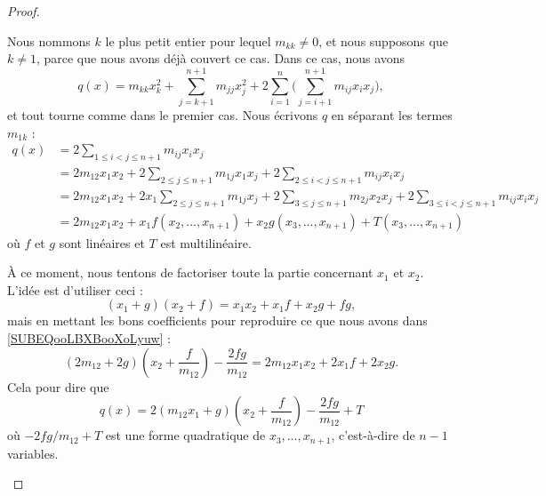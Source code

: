 \begin{proof}
\begin{subproof}
		Nous nommons \( k\) le plus petit entier pour lequel \( m_{kk}\neq 0\), et nous supposons que \( k\neq 1\), parce que nous avons déjà couvert ce cas. Dans ce cas, nous avons
		\begin{equation}
			q(x)=m_{kk}x_k^2+\sum_{j=k+1}^{n+1}m_{jj}x_j^2  +2\sum_{i=1}^n\big( \sum_{j=i+1}^{n+1}m_{ij}x_ix_j \big),
		\end{equation}
		et tout tourne comme dans le premier cas.
		\spitem[\( m_{ii}=0\) pour tout \( i\) et \( m_{12}\neq 0\)]
		Nous écrivons \( q\) en séparant les termes \( m_{1k}\) :
		\begin{subequations}
			\begin{align}
				q(x) & =2\sum_{1\leq i<j\leq n+1}m_{ij}x_ix_j                                                                                       \\
				     & =2m_{12}x_1x_2+2\sum_{2\leq j\leq n+1}m_{1j}x_1x_j+2\sum_{2\leq i<j\leq n+1}m_{ij}x_ix_j                                     \\
				     & =2m_{12}x_1x_2+2x_1\sum_{2\leq j\leq n+1}m_{1j}x_j+2\sum_{3\leq j\leq n+1}m_{2j}x_2x_j+2\sum_{3\leq i<j\leq n+1}m_{ij}x_ix_j \\
				     & =2m_{12}x_1x_2+x_1f(x_2,\ldots, x_{n+1})+x_2g(x_3,\ldots, x_{n+1})+T(x_3,\ldots, x_{n+1})      \label{SUBEQooLBXBooXoLyuw}
			\end{align}
		\end{subequations}
		où \( f\) et \( g\) sont linéaires et \( T\) est multilinéaire.

		À ce moment, nous tentons de factoriser toute la partie concernant \( x_1\) et \( x_2\). L'idée est d'utiliser ceci :
		\begin{equation}
			(x_1+g)(x_2+f)=x_1x_2+x_1f+x_2g+fg,
		\end{equation}
		mais en mettant les bons coefficients pour reproduire ce que nous avons dans \eqref{SUBEQooLBXBooXoLyuw} :
		\begin{equation}
			(2m_{12}+2g)(x_2+\frac{ f }{ m_{12} })-\frac{ 2fg }{ m_{12} }=2m_{12}x_1x_2+2x_1f+2x_2g.
		\end{equation}
		Cela pour dire que
		\begin{equation}
			q(x)=2(m_{12}x_1+g)(x_2+\frac{ f }{ m_{12} })-\frac{ 2fg }{ m_{12} }+T
		\end{equation}
		où \(-2fg/m_{12}+T\) est une forme quadratique de \( x_3,\ldots, x_{n+1}\), c'est-à-dire de \( n-1\) variables.


\end{subproof}
\end{proof}
